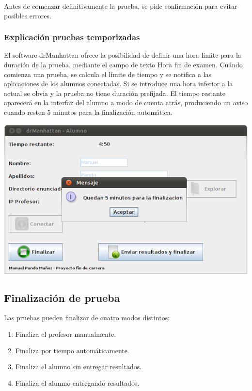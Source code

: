 \documentclass[11pt]{article}
\begin{document}
Antes de comenzar definitivamente la prueba, se pide confirmación para evitar posibles errores.




\subsubsection{Explicación pruebas temporizadas}

El software drManhattan ofrece la posibilidad de definir una hora límite para la duración de la prueba, mediante el campo de texto Hora fin de examen. Cuándo comienza una prueba, se calcula el límite de tiempo y se notifica a las aplicaciones de los alumnos conectadas. Si se introduce una hora inferior a la actual se obvia y la prueba no tiene duración prefijada. El tiempo restante aparecerá en la interfaz del alumno a modo de cuenta atrás, produciendo un aviso cuando resten 5 minutos para la finalización automática.

\begin{center}
    \includegraphics[width=.90\linewidth]{imagenes/tiempoLimite}
\end{center}


\subsection{Finalización de prueba}
\label{sec:finalizacionPrueba}

Las pruebas pueden finalizar de cuatro modos distintos:

\begin{enumerate}

    \item Finaliza el profesor manualmente.

    \item Finaliza por tiempo automáticamente.

    \item Finaliza el alumno sin entregar resultados.

    \item Finaliza el alumno entregando resultados.

\end{enumerate}
\end{document}
